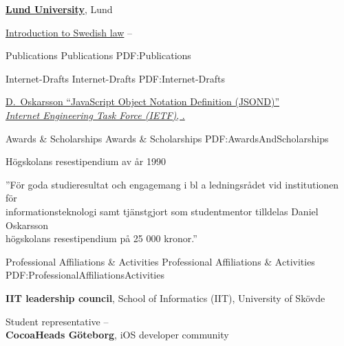 \documentclass[letterpaper,MMMyyyy,nonstopmode]{simpleresumecv}
\begin{document}
\begin{Body}
\BigGap
\Entry
\href{https://www.law.lu.se/}
{\textbf{Lund University}},
Lund

\Gap
\BulletItem
\href{https://www.lu.se/lubas/i-uoh-lu-JURF11}
{Introduction to Swedish law}
\hfill
{} --


\Section
{Publications}
{Publications}
{PDF:Publications}

\SubSection
{Internet-Drafts}
{Internet-Drafts}
{PDF:Internet-Drafts}

\begingroup
\renewcommand{\MaxNumberedItem}{[88]}

\BigGap
\BulletItem
\href{https://www.ietf.org/archive/id/draft-oskarsson-jsond-00.txt}
{\underline{D.~Oskarsson}
``JavaScript Object Notation Definition (JSOND)''\\
\textit{Internet Engineering Task Force (IETF)}, .}

\endgroup



\Section
{Awards \&\newline
Scholarships}
{Awards \& Scholarships}
{PDF:AwardsAndScholarships}

\BulletItem
Högskolans resestipendium av år 1990
\hfill
{}
\begin{Detail}
\Item
''För goda studieresultat och engagemang i bl a ledningsrådet vid institutionen för\\
informationsteknologi samt tjänstgjort som studentmentor tilldelas Daniel Oskarsson\\
högskolans resestipendium på 25 000 kronor.''
\end{Detail}


\Section
{Professional Affiliations\newline
\& Activities}
{Professional Affiliations \& Activities}
{PDF:ProfessionalAffiliationsActivities}

\Entry
\textbf{IIT leadership council},
\newline
School of Informatics (IIT), University of Skövde

\Gap
\BulletItem
Student representative
\hfill
{} -- 
\\
\Entry
\textbf{CocoaHeads Göteborg},
\newline
iOS developer community


\end{Body}
\end{document}
